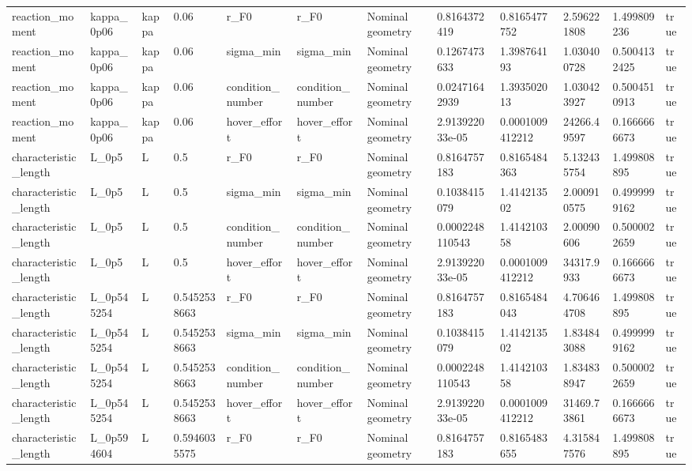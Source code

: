 \begin{tabular}{@{}llllllllllll@{}}
reaction\_moment & kappa\_0p06 & kappa & 0.06 & r\_F0 & r\_F0 & Nominal geometry & 0.8164372419 & 0.8165477752 & 2.596221808 & 1.499809236 & true \\
reaction\_moment & kappa\_0p06 & kappa & 0.06 & sigma\_min & sigma\_min & Nominal geometry & 0.1267473633 & 1.398764193 & 1.030400728 & 0.5004132425 & true \\
reaction\_moment & kappa\_0p06 & kappa & 0.06 & condition\_number & condition\_number & Nominal geometry & 0.02471642939 & 1.393502013 & 1.030423927 & 0.5004510913 & true \\
reaction\_moment & kappa\_0p06 & kappa & 0.06 & hover\_effort & hover\_effort & Nominal geometry & 2.913922033e-05 & 0.0001009412212 & 24266.49597 & 0.1666666673 & true \\
characteristic\_length & L\_0p5 & L & 0.5 & r\_F0 & r\_F0 & Nominal geometry & 0.8164757183 & 0.8165484363 & 5.132435754 & 1.499808895 & true \\
characteristic\_length & L\_0p5 & L & 0.5 & sigma\_min & sigma\_min & Nominal geometry & 0.1038415079 & 1.414213502 & 2.000910575 & 0.4999999162 & true \\
characteristic\_length & L\_0p5 & L & 0.5 & condition\_number & condition\_number & Nominal geometry & 0.0002248110543 & 1.414210358 & 2.00090606 & 0.5000022659 & true \\
characteristic\_length & L\_0p5 & L & 0.5 & hover\_effort & hover\_effort & Nominal geometry & 2.913922033e-05 & 0.0001009412212 & 34317.9933 & 0.1666666673 & true \\
characteristic\_length & L\_0p545254 & L & 0.5452538663 & r\_F0 & r\_F0 & Nominal geometry & 0.8164757183 & 0.8165484043 & 4.706464708 & 1.499808895 & true \\
characteristic\_length & L\_0p545254 & L & 0.5452538663 & sigma\_min & sigma\_min & Nominal geometry & 0.1038415079 & 1.414213502 & 1.834843088 & 0.4999999162 & true \\
characteristic\_length & L\_0p545254 & L & 0.5452538663 & condition\_number & condition\_number & Nominal geometry & 0.0002248110543 & 1.414210358 & 1.834838947 & 0.5000022659 & true \\
characteristic\_length & L\_0p545254 & L & 0.5452538663 & hover\_effort & hover\_effort & Nominal geometry & 2.913922033e-05 & 0.0001009412212 & 31469.73861 & 0.1666666673 & true \\
characteristic\_length & L\_0p594604 & L & 0.5946035575 & r\_F0 & r\_F0 & Nominal geometry & 0.8164757183 & 0.8165483655 & 4.315847576 & 1.499808895 & true \\

\end{tabular}
